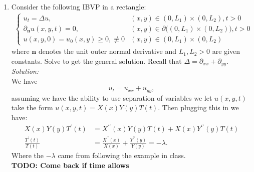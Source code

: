 \documentclass[10pt]{amsart}
\theoremstyle{nonumberplain}
\begin{document}
\begin{enumerate}[label={\bf {\arabic*}:}]
\item Consider the following IBVP in a rectangle: \\
\begin{align*}
\begin{cases}
u_t = \Delta u, &(x, y) \in (0, L_1) \times (0, L_2), t > 0 \\
\partial_{\bm n} u(x, y, t) = 0, &(x, y) \in \partial \big( (0, L_1) \times (0, L_2) \big), t > 0\\
u(x, y, 0) = u_0(x, y) \geq 0, \not \equiv 0 &(x, y) \in (0, L_1) \times (0, L_2)
\end{cases}
\end{align*}
where $\bm n$ denotes the unit outer normal derivative and $L_1, L_2 > 0$ are given constants.
Solve to get the general solution.
Recall that $\Delta = \partial_{xx} + \partial_{yy}$. \\
\textit{Solution:} \\
We have
$$
u_t = u_{xx} + u_{yy},
$$
assuming we have the ability to use separation of variables we let $u(x, y, t)$ take the form
$u(x, y, t) = X(x)Y(y)T(t)$.
Then plugging this in we have:
\begin{align*}
X(x)Y(y)T^\prime(t) &= X^{\prime\prime}(x)Y(y)T(t) + X(x)Y^{\prime\prime}(y)T(t) \\
\frac {T^\prime(t)}{T(t)} &= \frac{X^{\prime\prime}(x)}{X(x)} + \frac{Y^{\prime\prime}(y)}{Y(y)} = -\lambda.
\end{align*}
Where the $-\lambda$ came from following the example in class. \\
\textbf{TODO: Come back if time allows}

\end{enumerate}
\end{document}
